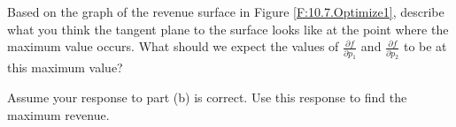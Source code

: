 \begin{pa}
    \item Based on the graph of the revenue surface in Figure \ref{F:10.7.Optimize1}, describe what you think the tangent plane to the surface looks like at the point where the maximum value occurs. What should we expect the values of $\frac{\partial f}{\partial p_1}$ and $\frac{\partial f}{\partial p_2}$ to be at this maximum value?



\begin{comment}

At the highest point, it looks like the tangent plane is horizontal, and so we should expect $\nabla f$ to be 0. In other words, at the maximum value we should have $\frac{\partial f}{\partial p_1} = 0$ and $\frac{\partial f}{\partial p_2} = 0$.


\end{comment}

    \item Assume your response to part (b) is correct. Use this response to find the maximum revenue.



\begin{comment}

We calculate $\frac{\partial f}{\partial p_1}$ and $\frac{\partial f}{\partial p_2}$ and find out when they are simultaneously 0. Now
\[\frac{\partial f}{\partial p_1} = 150 - 2p_2 - 4p_1 \ \ \text{ and } \ \ \frac{\partial f}{\partial p_2} = 200 - 2p_1 - 6p_2.\]
The system
\begin{align*}
\frac{\partial f}{\partial p_1} &= 0 \\
\frac{\partial f}{\partial p_2} &= 0
\end{align*}
or
\begin{align*}
150 - 2p_2 - 4p_1 &= 0 \\
200 - 2p_1 - 6p_2 &= 0
\end{align*}
is a system of two linear equations in two unknowns. Multiplying both sides of the second equation by $-2$ and then adding corresponding sides of this new equation with the first equation yields the equation
\[-250 + 10p_2 = 0\]
or
\[p_2 = 25.\]
Substituting back into the first equation shows that
\[p_1 = 25.\]
So the maximum revenue occurs with $p_1=p_2 = 25$ and the maximum revenue is
\[f(25,25) = 4375.\]



\end{comment}

    \ea
\end{pa} \afterpa 